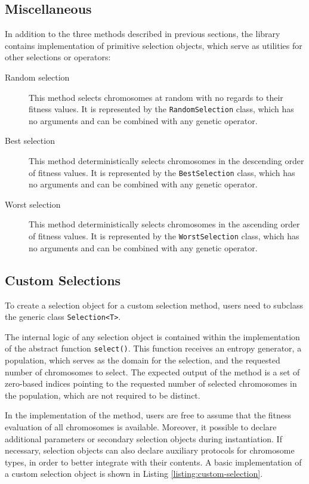 \subsection{Miscellaneous}
In addition to the three methods described in previous sections, the library contains implementation of primitive selection objects, which serve as utilities for other selections or operators:
~
\begin{description}
	\item[Random selection]
	This method selects chromosomes at random with no regards to their fitness values. It is represented by the \texttt{RandomSelection} class, which has no arguments and can be combined with any genetic operator.

	\item[Best selection]
	This method deterministically selects chromosomes in the descending order of fitness values. It is represented by the \texttt{BestSelection} class, which has no arguments and can be combined with any genetic operator.

	\item[Worst selection]	
	This method deterministically selects chromosomes in the ascending order of fitness values. It is represented by the \texttt{WorstSelection} class, which has no arguments and can be combined with any genetic operator.
\end{description}

\subsection{Custom Selections}
To create a selection object for a custom selection method, users need to subclass the generic class \texttt{Selection<T>}.

The internal logic of any selection object is contained within the implementation of the abstract function \texttt{select()}. This function receives an entropy generator, a population, which serves as the domain for the selection, and the requested number of chromosomes to select. The expected output of the method is a set of zero-based indices pointing to the requested number of selected chromosomes in the population, which are not required to be distinct.

In the implementation of the method, users are free to assume that the fitness evaluation of all chromosomes is available.  Moreover, it possible to declare additional parameters or secondary selection objects during instantiation. If necessary, selection objects can also declare auxiliary protocols for chromosome types, in order to better integrate with their contents. A basic implementation of a custom selection object is shown in Listing \ref{listing:custom-selection}.

